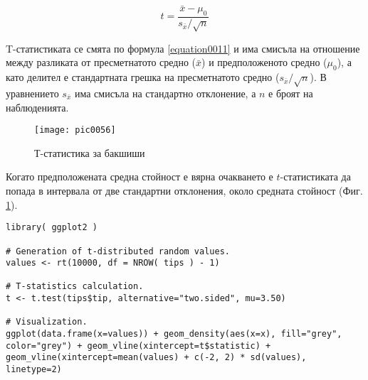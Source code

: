 \begin{equation}
t = \frac{\bar{x}-\mu_0}{s_{\bar{x}}/\sqrt{n}}
\label{equation0011}
\end{equation}

T-статистиката се смята по формула \ref{equation0011} и има смисъла на отношение между разликата от пресметнатото средно ($\bar{x}$) и предположеното средно ($\mu_0$), а като делител е стандартната грешка на пресметнатото средно ($s_{\bar{x}}/\sqrt{n}$). В уравнението $s_{\bar{x}}$ има смисъла на стандартно отклонение, а $n$ е броят на наблюденията. 

\begin{figure}[h!]
  \centering
  \texttt{[image: pic0056]}
  \caption{Т-статистика за бакшиши}
\label{figure0056}
\end{figure}
\FloatBarrier

Когато предположената средна стойност е вярна очакването е $t$-статистиката да попада в интервала от две стандартни отклонения, около средната стойност (Фиг. \ref{figure0056}). 

\begin{lstlisting}[caption=Визуализация на t-разпределение, label=listing0169]
library( ggplot2 )

# Generation of t-distributed random values.
values <- rt(10000, df = NROW( tips ) - 1)

# T-statistics calculation.
t <- t.test(tips$tip, alternative="two.sided", mu=3.50)

# Visualization.
ggplot(data.frame(x=values)) + geom_density(aes(x=x), fill="grey", color="grey") + geom_vline(xintercept=t$statistic) + geom_vline(xintercept=mean(values) + c(-2, 2) * sd(values), linetype=2)
\end{lstlisting}



